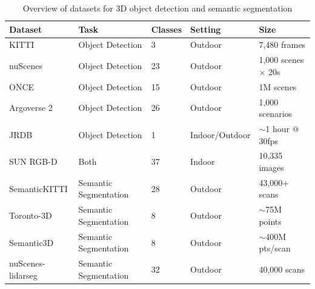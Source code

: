 \begin{table}[h]
	\centering
	\begin{tabular}{lllll}
		\toprule
		\textbf{Dataset}                                                                        & \textbf{Task}         & \textbf{Classes} & \textbf{Setting} & \textbf{Size}             \\
		\midrule
		KITTI \cite{geiger_are_2012}                                                            & Object Detection      & 3                & Outdoor          & 7,480 frames              \\
		nuScenes \cite{Caesar_Bankiti_Lang_Vora_Liong_Xu_Krishnan_Pan_Baldan_Beijbom_2020}      & Object Detection      & 23               & Outdoor          & 1,000 scenes $\times$ 20s \\
		ONCE \cite{mao_one_2021}                                                                & Object Detection      & 15               & Outdoor          & 1M scenes                 \\
		Argoverse 2 \cite{wilson_argoverse_2023}                                                & Object Detection      & 26               & Outdoor          & 1,000 scenarios           \\
		JRDB \cite{Martín-Martín_Patel_Rezatofighi_Shenoi_Gwak_Frankel_Sadeghian_Savarese_2023} & Object Detection      & 1                & Indoor/Outdoor   & $\sim$1 hour @ 30fps      \\
		SUN RGB-D \cite{Song_Lichtenberg_Xiao_2015}                                             & Both                  & 37               & Indoor           & 10,335 images             \\
		SemanticKITTI \cite{Behley_Garbade_Milioto_Quenzel_Behnke_Stachniss_Gall_2019}          & Semantic Segmentation & 28               & Outdoor          & 43,000+ scans             \\
		Toronto-3D \cite{Tan_Qin_Ma_Li_Du_Cai_Yang_Li_2020}                                     & Semantic Segmentation & 8                & Outdoor          & $\sim$75M points          \\
		Semantic3D \cite{Hackel_Savinov_Ladicky_Wegner_Schindler_Pollefeys_2017}                & Semantic Segmentation & 8                & Outdoor          & $\sim$400M pts/scan       \\
		nuScenes-lidarseg \cite{Fong_Mohan_Hurtado_Zhou_Caesar_Beijbom_Valada_2022}             & Semantic Segmentation & 32               & Outdoor          & 40,000 scans              \\
		\bottomrule
	\end{tabular}
	\caption{Overview of datasets for 3D object detection and semantic segmentation}
	\label{tab:datasets}
\end{table}

